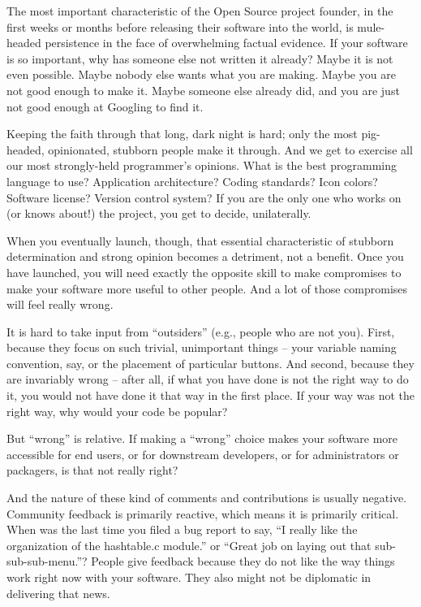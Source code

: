 

The most important characteristic of the Open Source project founder, in the
first weeks or months before releasing their software into the world, is
mule-headed persistence in the face of overwhelming factual evidence. If your
software is so important, why has someone else not written it already? Maybe it is not even possible. Maybe nobody else wants what you are making. Maybe you are not good enough to make it. Maybe someone else already did, and you are just not good enough at Googling to find it.

Keeping the faith through that long, dark night is hard; only the most
pig-headed, opinionated, stubborn people make it through. And we get to exercise
all our most strongly-held programmer's opinions. What is the best programming
language to use? Application architecture? Coding standards? Icon colors?
Software license? Version control system? If you are the only one who works on
(or knows about!) the project, you get to decide, unilaterally.

When you eventually launch, though, that essential characteristic of stubborn
determination and strong opinion becomes a detriment, not a benefit. Once you have launched, you will need exactly the opposite skill to make compromises to make your software more useful to other people. And a lot of those compromises will feel really wrong.

It is hard to take input from ``outsiders'' (e.g., people who are not you). First, because they focus on such trivial, unimportant things -- your variable naming convention, say, or the placement of particular buttons. And second, because they are invariably wrong -- after all, if what you have done is not the right way to do it, you would not have done it that way in the first place. If your way was not the right way, why would your code be popular?

But ``wrong'' is relative. If making a ``wrong'' choice makes your software more
accessible for end users, or for downstream developers, or for administrators or
packagers, is that not really right?

And the nature of these kind of comments and contributions is usually negative.
Community feedback is primarily reactive, which means it is primarily critical.
When was the last time you filed a bug report to say, ``I really like the
organization of the hashtable.c module.'' or ``Great job on laying out that
sub-sub-sub-menu.''? People give feedback because they do not like the way things work right now with your software. They also might not be diplomatic in
delivering that news.

